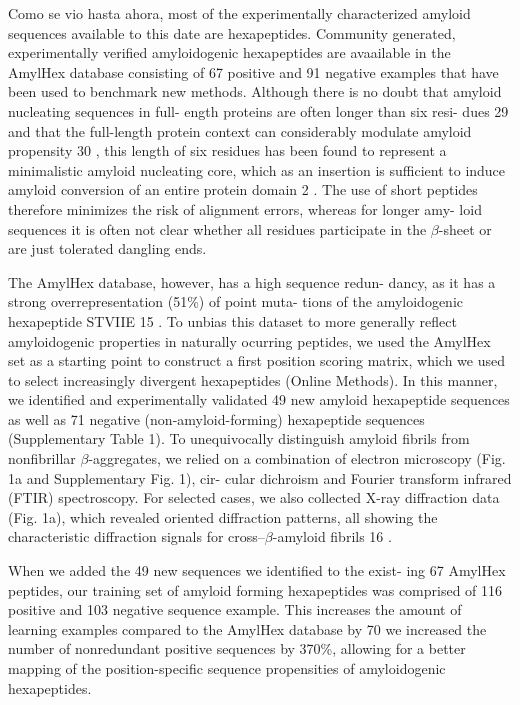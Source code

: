 Como se vio hasta ahora, most of the experimentally characterized amyloid sequences available to this date are hexapeptides.
Community generated, experimentally
verified amyloidogenic hexapeptides are avaailable in the AmylHex 
database consisting of 67 positive and 91 
negative examples that have been used to benchmark new methods.
Although there is no doubt that amyloid nucleating sequences in full- ength proteins are often longer than six resi-
dues 29 and that the full-length protein context can considerably
modulate amyloid propensity 30 , this length of six residues has
been found to represent a minimalistic amyloid nucleating core,
which as an insertion is sufficient to induce amyloid conversion
of an entire protein domain 2 . The use of short peptides therefore
minimizes the risk of alignment errors, whereas for longer amy-
loid sequences it is often not clear whether all residues participate
in the $\beta$-sheet or are just tolerated dangling ends.

The AmylHex database, however, has a high sequence redun-
dancy, as it has a strong overrepresentation (51\%) of point muta-
tions of the amyloidogenic hexapeptide STVIIE 15 . To unbias
this dataset to more generally reflect amyloidogenic 
properties in naturally ocurring peptides, we used the AmylHex set as a
starting point to construct a first position scoring matrix, which
we used to select increasingly divergent hexapeptides (Online
Methods). In this manner, we identified and experimentally
validated 49 new amyloid hexapeptide sequences as well as
71 negative (non-amyloid-forming) hexapeptide sequences
(Supplementary Table 1).
To unequivocally distinguish amyloid
fibrils from nonfibrillar $\beta$-aggregates, we relied on a combination
of electron microscopy (Fig. 1a and Supplementary Fig. 1), cir-
cular dichroism and Fourier transform infrared (FTIR) spectroscopy. 
For selected cases, we also collected X-ray diffraction data
(Fig. 1a), which revealed oriented diffraction patterns, all showing
the characteristic diffraction signals for cross–$\beta$-amyloid fibrils 16 .

When we added the 49 new sequences we identified to the exist-
ing 67 AmylHex peptides, our training set of amyloid forming hexapeptides was comprised of 116 positive and 103 negative
sequence example. 
This increases the amount of learning examples
compared to the AmylHex database by 70%
we increased the number of nonredundant positive sequences
by 370\%, allowing for a better mapping of the position-specific
sequence propensities of amyloidogenic hexapeptides.



